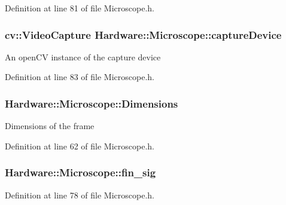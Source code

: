 Definition at line 81 of file Microscope.\+h.

\hypertarget{class_hardware_1_1_microscope_a8fd921d7c937e808c5bc44c0294aa490}{}
\subsubsection[{capture\+Device}]{\setlength{\rightskip}{0pt plus 5cm}cv\+::\+Video\+Capture Hardware\+::\+Microscope\+::capture\+Device\hspace{0.3cm}{\ttfamily [private]}}\label{class_hardware_1_1_microscope_a8fd921d7c937e808c5bc44c0294aa490}
An open\+C\+V instance of the capture device 

Definition at line 83 of file Microscope.\+h.

\hypertarget{class_hardware_1_1_microscope_ae89c25318a095e2efcdf48fb8f769038}{}
\subsubsection[{Dimensions}]{ Hardware\+::\+Microscope\+::\+Dimensions}\label{class_hardware_1_1_microscope_ae89c25318a095e2efcdf48fb8f769038}
Dimensions of the frame 

Definition at line 62 of file Microscope.\+h.

\hypertarget{class_hardware_1_1_microscope_a8c23e6a55ef77443e861418a15c6e244}{}
\subsubsection[{fin\+\_\+sig}]{ Hardware\+::\+Microscope\+::fin\+\_\+sig\hspace{0.3cm}{\ttfamily [private]}}\label{class_hardware_1_1_microscope_a8c23e6a55ef77443e861418a15c6e244}


Definition at line 78 of file Microscope.\+h.

\hypertarget{class_hardware_1_1_microscope_ac2da14781a22924a389fc287df3dbfda}{}
